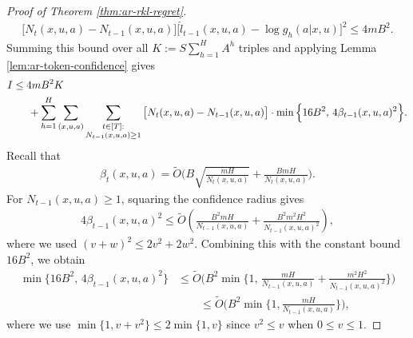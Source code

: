 \documentclass[11pt]{article}
\begin{document}
\begin{proof}[Proof of Theorem \ref{thm:ar-rkl-regret}]
\begin{align*}
    \big[N_t(x,u,a)-N_{t-1}(x,u,a)\big]
    \Big[
        \hat l_{t-1}(x,u,a)-\log g_h(a|x,u)
    \Big]^2
    \leq4mB^2.
\end{align*}
Summing this bound over all $K:=S\sum_{h=1}^H A^h$ triples and applying Lemma \ref{lem:ar-token-confidence} gives
\begin{align}
\notag
    &I
    \leq
    4mB^2K
    \\\label{eq:nonzero-sum}
    & \qquad+
    \sum_{h=1}^H
    \sum_{(x,u,a)}
    \sum_{\substack{t\in[T]:\\N_{t-1}(x,u,a)\geq1}}
    \big[N_t(x,u,a)-N_{t-1}(x,u,a)\big]\cdot
    \min\Big\{
        16B^2,\,
        4\beta_{t-1}(x,u,a)^2
    \Big\}.
\end{align}
Recall that
\begin{align*}
    \beta_t(x,u,a) = \tilde O\bigg(
        B\sqrt{\frac{mH}{N_t(x,u,a)}}
        +
        \frac{BmH}{N_t(x,u,a)}
    \bigg).
\end{align*}
For $N_{t-1}(x,u,a)\geq1$, squaring the confidence radius gives
\begin{align*}
    4\beta_{t-1}(x,u,a)^2
    \leq
    \widetilde O\left(
        \frac{B^2mH}{N_{t-1}(x,u,a)}
        +
        \frac{B^2m^2H^2}{N_{t-1}(x,u,a)^2}
    \right),
\end{align*}
where we used $(v+w)^2\leq2v^2+2w^2$.
Combining this with the constant bound $16B^2$, we obtain
\begin{align*}
    \min\Big\{
        16B^2,\,
        4\beta_{t-1}(x,u,a)^2
    \Big\}&\leq
    \widetilde O\bigg(
        B^2\min\bigg\{
            1,\,
            \frac{mH}{N_{t-1}(x,u,a)}
            +
            \frac{m^2H^2}{N_{t-1}(x,u,a)^2}
        \bigg\}
    \bigg)\\
    &\qquad\leq
    \widetilde O\bigg(
        B^2 \min \bigg\{1, \frac{mH}{N_{t-1}(x,u,a)}\bigg\}
    \bigg),
\end{align*}
where we use $\min \{1,v+v^2\} \le 2 \min\{1,v\}$ since $v^2 \le v$ when $0\le v \le 1$.


\end{proof}
\end{document}
